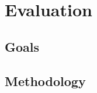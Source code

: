\section{Evaluation}
\label{Sec:Evaluation}

	\subsection{Goals}
	\label{Sec:Goals}
	
	\subsection{Methodology}
	\label{Sec:Methodology}
	
